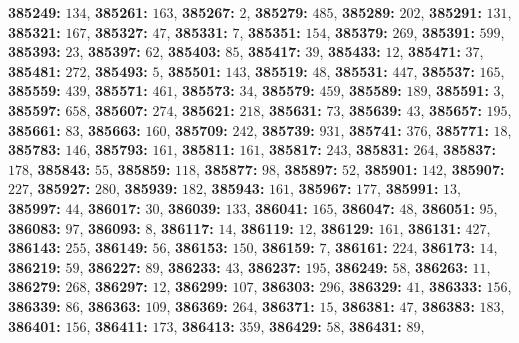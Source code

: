 \textsf{\bfseries 385249:} $134$, \textsf{\bfseries 385261:} $163$, \textsf{\bfseries 385267:} $2$, \textsf{\bfseries 385279:} $485$, \textsf{\bfseries 385289:} $202$, \textsf{\bfseries 385291:} $131$, \textsf{\bfseries 385321:} $167$, \textsf{\bfseries 385327:} $47$, \textsf{\bfseries 385331:} $7$, \textsf{\bfseries 385351:} $154$, \textsf{\bfseries 385379:} $269$, \textsf{\bfseries 385391:} $599$, \textsf{\bfseries 385393:} $23$, \textsf{\bfseries 385397:} $62$, \textsf{\bfseries 385403:} $85$, \textsf{\bfseries 385417:} $39$, \textsf{\bfseries 385433:} $12$, \textsf{\bfseries 385471:} $37$, \textsf{\bfseries 385481:} $272$, \textsf{\bfseries 385493:} $5$, \textsf{\bfseries 385501:} $143$, \textsf{\bfseries 385519:} $48$, \textsf{\bfseries 385531:} $447$, \textsf{\bfseries 385537:} $165$, \textsf{\bfseries 385559:} $439$, \textsf{\bfseries 385571:} $461$, \textsf{\bfseries 385573:} $34$, \textsf{\bfseries 385579:} $459$, \textsf{\bfseries 385589:} $189$, \textsf{\bfseries 385591:} $3$, \textsf{\bfseries 385597:} $658$, \textsf{\bfseries 385607:} $274$, \textsf{\bfseries 385621:} $218$, \textsf{\bfseries 385631:} $73$, \textsf{\bfseries 385639:} $43$, \textsf{\bfseries 385657:} $195$, \textsf{\bfseries 385661:} $83$, \textsf{\bfseries 385663:} $160$, \textsf{\bfseries 385709:} $242$, \textsf{\bfseries 385739:} $931$, \textsf{\bfseries 385741:} $376$, \textsf{\bfseries 385771:} $18$, \textsf{\bfseries 385783:} $146$, \textsf{\bfseries 385793:} $161$, \textsf{\bfseries 385811:} $161$, \textsf{\bfseries 385817:} $243$, \textsf{\bfseries 385831:} $264$, \textsf{\bfseries 385837:} $178$, \textsf{\bfseries 385843:} $55$, \textsf{\bfseries 385859:} $118$, \textsf{\bfseries 385877:} $98$, \textsf{\bfseries 385897:} $52$, \textsf{\bfseries 385901:} $142$, \textsf{\bfseries 385907:} $227$, \textsf{\bfseries 385927:} $280$, \textsf{\bfseries 385939:} $182$, \textsf{\bfseries 385943:} $161$, \textsf{\bfseries 385967:} $177$, \textsf{\bfseries 385991:} $13$, \textsf{\bfseries 385997:} $44$, \textsf{\bfseries 386017:} $30$, \textsf{\bfseries 386039:} $133$, \textsf{\bfseries 386041:} $165$, \textsf{\bfseries 386047:} $48$, \textsf{\bfseries 386051:} $95$, \textsf{\bfseries 386083:} $97$, \textsf{\bfseries 386093:} $8$, \textsf{\bfseries 386117:} $14$, \textsf{\bfseries 386119:} $12$, \textsf{\bfseries 386129:} $161$, \textsf{\bfseries 386131:} $427$, \textsf{\bfseries 386143:} $255$, \textsf{\bfseries 386149:} $56$, \textsf{\bfseries 386153:} $150$, \textsf{\bfseries 386159:} $7$, \textsf{\bfseries 386161:} $224$, \textsf{\bfseries 386173:} $14$, \textsf{\bfseries 386219:} $59$, \textsf{\bfseries 386227:} $89$, \textsf{\bfseries 386233:} $43$, \textsf{\bfseries 386237:} $195$, \textsf{\bfseries 386249:} $58$, \textsf{\bfseries 386263:} $11$, \textsf{\bfseries 386279:} $268$, \textsf{\bfseries 386297:} $12$, \textsf{\bfseries 386299:} $107$, \textsf{\bfseries 386303:} $296$, \textsf{\bfseries 386329:} $41$, \textsf{\bfseries 386333:} $156$, \textsf{\bfseries 386339:} $86$, \textsf{\bfseries 386363:} $109$, \textsf{\bfseries 386369:} $264$, \textsf{\bfseries 386371:} $15$, \textsf{\bfseries 386381:} $47$, \textsf{\bfseries 386383:} $183$, \textsf{\bfseries 386401:} $156$, \textsf{\bfseries 386411:} $173$, \textsf{\bfseries 386413:} $359$, \textsf{\bfseries 386429:} $58$, \textsf{\bfseries 386431:} $89$, 
